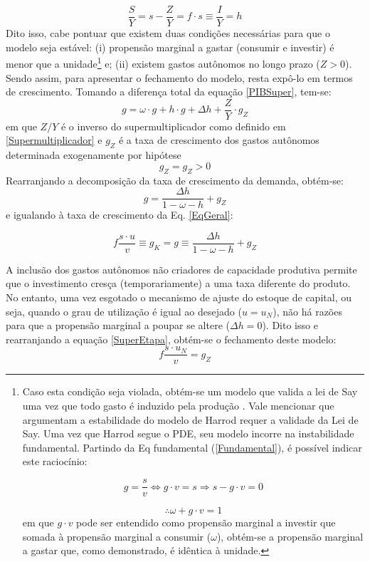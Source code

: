 \begin{equation}
\label{frac_h}
\frac{S}{Y} = s - \frac{Z}{Y} = f\cdot s \equiv \frac{I}{Y} = h
\end{equation}
Dito isso, cabe pontuar que  existem duas condições necessárias para que o modelo seja estável: (i) propensão marginal a gastar (consumir e investir) é menor que a unidade\footnote{
	Caso esta condição seja violada, obtém-se um modelo que valida a lei de Say uma vez que todo gasto é induzido pela produção \cite[p.~ 75]{serrano_sraffian_1995}.
	Vale mencionar que \textcite{serrano_trouble_2017} argumentam a estabilidade do modelo de Harrod requer a validade da Lei de Say. Uma vez que Harrod segue o PDE, seu modelo incorre na instabilidade fundamental. Partindo da Eq fundamental (\ref{Fundamental}), é possível indicar este raciocínio:
	
	$$
	g = \frac{s}{v} \Leftrightarrow g\cdot v = s \Rightarrow s - g\cdot v = 0
	$$
	
	$$
	\therefore \omega + g\cdot v = 1
	$$
	em que $g\cdot v$ pode ser entendido como propensão marginal a investir que somada à propensão marginal a consumir ($\omega$), obtém-se a propensão marginal a gastar que, como demonstrado, é idêntica à unidade.
} e; (ii) existem gastos autônomos no longo prazo ($Z > 0$).
Sendo assim, para apresentar o fechamento do modelo, resta expô-lo em termos de crescimento.
Tomando a diferença total da equação \ref{PIBSuper}, tem-se:
$$
g = \omega\cdot g + h\cdot g + \Delta h + \frac{Z}{Y}\cdot  g_Z
$$
em que $Z/Y$ é o inverso do supermultiplicador como definido em \ref{Supermultiplicador} e $g_Z$ é a taxa de crescimento dos gastos autônomos determinada exogenamente por hipótese
$$
g_Z =  g_Z > 0
$$
Rearranjando a decomposição da taxa de crescimento da demanda, obtém-se:
\begin{equation}
\label{crescimentosuper}
g = \frac{\Delta h}{1 - \omega - h} +  g_Z
\end{equation}
e igualando à taxa de crescimento da Eq. \ref{EqGeral}:

\begin{equation}
\label{SuperEtapa}
f\frac{s\cdot u}{v} \equiv g_K = g \equiv \frac{\Delta h}{1 - \omega - h} +  g_Z
\end{equation}


A inclusão dos gastos autônomos não criadores de capacidade produtiva permite que o investimento cresça (temporariamente) a uma taxa diferente do produto.
No entanto, uma vez esgotado o mecanismo de ajuste do estoque de capital, ou seja, quando o grau de utilização é igual ao desejado ($u = u_N$), não há razões para que a propensão marginal a poupar se altere ($\Delta h = 0$). 
Dito isso e rearranjando a equação \ref{SuperEtapa}, obtém-se o fechamento deste modelo:
$$
f\frac{ s\cdot  u_N}{ v} =  g_Z
$$



